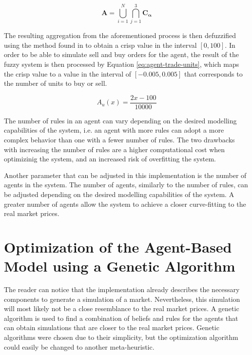 \begin{equation}
  \label{eq:aggregation-process}
  \bm{A} = \bigcup\limits_{i=1}^{N} \bigcap\limits_{j=1}^{3} \bm{C_{\alpha}}
\end{equation}

The resulting aggregation from the aforementioned process is then
defuzzified using the method found in \cite{Hernandez-Aguila2017} to obtain a
crisp value in the interval $[0, 100]$. In order to be able to simulate sell and
buy orders for the agent, the result of the fuzzy system is then processed by
Equation \ref{eq:agent-trade-units}, which maps the crisp value to a value in the
interval of $[-0.005, 0.005]$ that corresponds to the number of units to buy or
sell.

\begin{equation}
  \label{eq:agent-trade-units}
  A_u(x) = \frac{2x - 100}{10000}
\end{equation}

The number of rules in an agent can vary depending on the desired modelling
capabilities of the system, i.e. an agent with more rules can adopt a more
complex behavior than one with a fewer number of rules. The two drawbacks with
increasing the number of rules are a higher computational cost when optimizinig
the system, and an increased risk of overfitting the system. %

Another parameter that can be adjusted in this implementation is the number of
agents in the system. The number of agents, similarly to the number of rules,
can be adjusted depending on the desired modelling capabilities of the system. A
greater number of agents allow the system to achieve a closer curve-fitting to
the real market prices.

\section{Optimization of the Agent-Based Model using a Genetic Algorithm}
\label{section:optimization-of-the-agent-based-model-using-a-genetic-algorithm}

The reader can notice that the implementation already describes 
the necessary components to generate a simulation of a
market. Nevertheless, this simulation will most likely not be a close
resemblance to the real market prices. A genetic algorithm is used to find a
combination of beliefs and rules for the agents that can obtain simulations that
are closer to the real market prices. Genetic algorithms were chosen due to
their simplicity, but the optimization algorithm could easily be changed to
another meta-heuristic.  %

